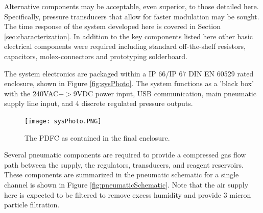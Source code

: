 Alternative components may be acceptable, even superior, to those detailed here. Specifically, pressure transducers that allow for faster modulation may be sought. The time response of the system developed here is covered in Section \ref{sec:characterization}. In addition to the key components listed here other basic electrical components were required including standard off-the-shelf resistors, capacitors, molex-connectors and prototyping solderboard.

The system electronics are packaged within a IP 66/IP 67 DIN EN 60529 rated enclosure, shown in Figure \vref{fig:sysPhoto}. The system functions as a 'black box' with the 240VAC$->$9VDC power input, USB communication, main pneumatic supply line input, and 4 discrete regulated pressure outputs.

\begin{figure}[H]
\centering 
\texttt{[image: sysPhoto.PNG]} 
\caption[Image of Packaged PDFC]{The PDFC as contained in the final enclosure.} 
\label{fig:sysPhoto} 
\end{figure}

Several pneumatic components are required to provide a compressed gas flow path between the supply, the regulators, transducers, and reagent reservoirs. These components are summarized in the pneumatic schematic for a single channel is shown in Figure \vref{fig:pneumaticSchematic}. Note that the air supply here is expected to be filtered to remove excess humidity and provide 3 micron particle filtration. 

